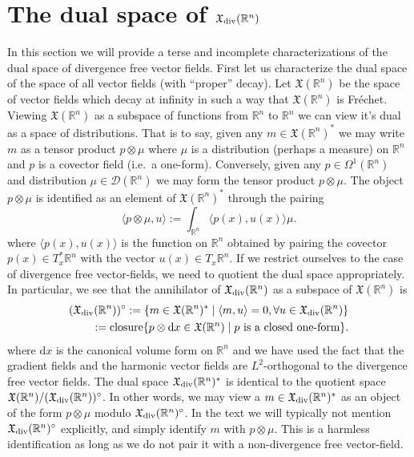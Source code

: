 \documentclass[12pt]{amsart}
\newcommand{\R}{\ensuremath{\mathbb{R}}}
\newcommand{\dx}{\ensuremath{\textrm{d}x}}
\begin{document}
\section{The dual space of $\mathfrak{X}_{\rm div}(\R^n)$}
\label{sec:measure_valued_momap}
In this section we will provide a terse and incomplete
characterizations of the dual space of divergence free 
vector fields.  First let us characterize the dual space of the space of all vector fields (with ``proper'' decay).
Let $\mathfrak{X}(\R^n)$ be the space of vector fields which decay at infinity
in such a way that $\mathfrak{X}(\R^n)$ is Fr\'echet.
Viewing $\mathfrak{X}(\R^n)$ as a subspace of functions from $\R^n$ to $\R^n$
we can view it's dual as a space of distributions.
That is to say, given any $m \in \mathfrak{X}(\R^n)^*$ we may write $m$ as a tensor
product $p \otimes \mu$ where $\mu$ is a distribution (perhaps a measure)
on $\R^n$ and $p$ is a covector field (i.e.\ a one-form).
Conversely, given any $p \in \Omega^1(\R^n)$ and distribution $\mu \in \mathcal{D}(\R^n)$
we may form the tensor product $p \otimes \mu$.
The object $p\otimes \mu$ is identified as an element of $\mathfrak{X}(\R^n)^*$ through
the pairing
\begin{equation*}
	\langle p \otimes \mu , u \rangle :=  \int_{\R^n} \langle p(x) , u(x) \rangle \mu.
\end{equation*}
where $\langle p(x),u(x) \rangle$ is the function on $\R^n$ obtained by pairing the covector $p(x) \in T_x^*\R^n$ with the vector $u(x) \in T_x\R^n$.
If we restrict ourselves to the case of divergence free vector-fields, we need to quotient
the dual space appropriately.  In particular, we see that the annihilator of $\mathfrak{X}_{\rm div}(\R^n)$
as a subspace of $\mathfrak{X}(\R^n)$ is
\begin{align*}
	(\mathfrak{X}_{\rm div}(\R^n) )^\circ := \{ m \in \mathfrak{X}(\R^n)^* \mid \langle m , u \rangle = 0 , \forall u \in \mathfrak{X}_{\rm div}(\R^n) \}\\
		:= {\rm closure}\{ p \otimes \dx \in \mathfrak{X}(\R^n) \mid p \text{ is a closed one-form} \}.
\end{align*}
where $\dx$ is the canonical volume form on $\R^n$ and
we have used the fact that the gradient fields and the harmonic vector fields are $L^2$-orthogonal to the divergence free vector fields.
The dual space $\mathfrak{X}_{\rm div}(\R^n)^*$ is identical to the quotient space $\mathfrak{X}(\R^n) / (\mathfrak{X}_{\rm div}(\R^n))^\circ$.
In other words, we may view a $m \in \mathfrak{X}_{\rm div}(\R^n)^*$ as an object of the form $p \otimes \mu$ modulo $\mathfrak{X}_{\rm div}(\R^n)^\circ$.
In the text we will typically not mention $\mathfrak{X}_{\rm div}(\R^n)^\circ$ explicitly, and simply identify $m$ with $p \otimes \mu$.
This is a harmless identification as long as we do not pair it with a non-divergence free vector-field.
\end{document}
